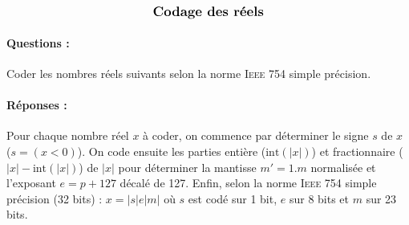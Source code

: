 \documentclass[11pt,a4paper]{article}
\begin{document}

$$\mbox{\textbf{\large Codage des réels}}$$


\paragraph{Questions :}
Coder les nombres réels suivants selon la norme \textsc{Ieee} 754 simple précision.


\paragraph{Réponses :} 
Pour chaque nombre réel $x$ à coder, on commence par déterminer le signe $s$
de $x$ ($s = (x<0)$). On code ensuite les parties entière ($\mbox{int}(|x|)$) et fractionnaire 
($|x| - \mbox{int}(|x|)$) de $|x|$
pour déterminer la mantisse $m' = 1.m$ normalisée et l'exposant $e = p+127$ 
décalé de 127.
Enfin, selon la norme \textsc{Ieee} 754 simple précision (32 bits) :
$x = |s|e|m|$ où $s$ est codé sur 1 bit, $e$ sur 8 bits et $m$ sur 23 bits.
\end{document}

